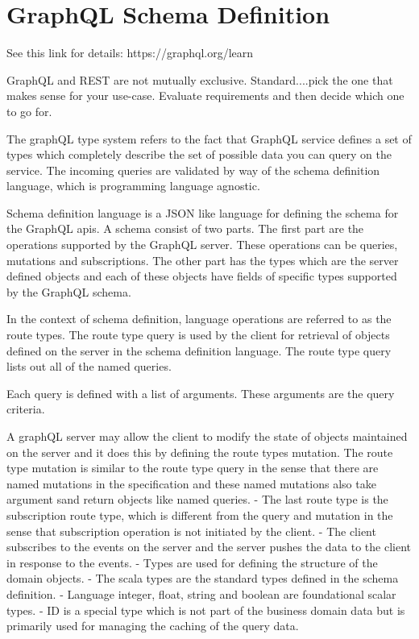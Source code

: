 \section{GraphQL Schema Definition}
See this link for details: https://graphql.org/learn

GraphQL and REST are not mutually exclusive.
Standard....pick the one that makes sense for your use-case.
Evaluate requirements and then decide which one to go for.

The graphQL type system refers to the fact that GraphQL service defines a set of types which completely describe the set of possible data you can query on the service.
The incoming queries are validated by way of the schema definition language, which is programming language agnostic.

Schema definition language is a JSON like language for defining the schema for the GraphQL apis.
A schema consist of two parts.
The first part are the operations supported by the GraphQL server.
These operations can be queries, mutations and subscriptions.
The other part has the types which are the server defined objects and each of these objects have fields of specific types supported by the GraphQL schema.

In the context of schema definition, language operations are referred to as the route types.
The route type query is used by the client for retrieval of objects defined on the server in the schema definition language.
The route type query lists out all of the named queries.

Each query is defined with a list of arguments.
These arguments are the query criteria.

A graphQL server may allow the client to modify the state of objects maintained on the server and it does this by defining the route types mutation.
The route type mutation is similar to the route type query in the sense that there are named mutations in the specification and these named mutations also take argument sand return objects like named queries.
- The last route type is the subscription route type, which is different from the query and mutation in the sense that subscription operation is not initiated by the client.
- The client subscribes to the events on the server and the server pushes the data to the client in response to the events.
- Types are used for defining the structure of the domain objects.
- The scala types are the standard types defined in the schema definition.
- Language integer, float, string and boolean are foundational scalar types.
- ID is a special type which is not part of the business domain data but is primarily used for managing the caching of the query data.

